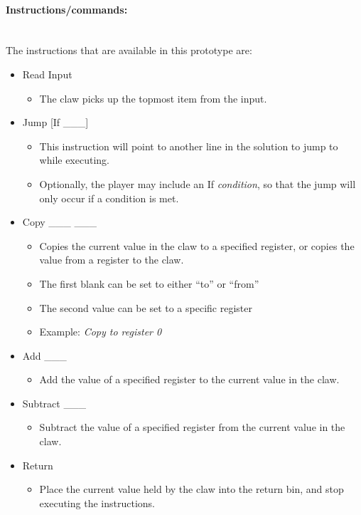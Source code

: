 \paragraph{Instructions/commands:} ~\\
The instructions that are available in this prototype are:
\begin{itemize}
	\item Read Input
	\begin{itemize}
		\item The claw picks up the topmost item from the input.
	\end{itemize}
	\item Jump [If \_\_\_]
	\begin{itemize}
		\item This instruction will point to another line in the solution to jump to while executing.
		\item Optionally, the player may include an If \textit{condition}, so that the jump will only occur if a condition is met.
	\end{itemize}
	\item Copy \_\_\_ \_\_\_
	\begin{itemize}
		\item Copies the current value in the claw to a specified register, or copies the value from a register to the claw.
		\item The first blank can be set to either ``to'' or ``from''
		\item The second value can be set to a specific register
		\item Example: \textit{Copy to register 0}
	\end{itemize}
	\item Add \_\_\_
	\begin{itemize}
		\item Add the value of a specified register to the current value in the claw.
	\end{itemize}
	\item Subtract \_\_\_
	\begin{itemize}
		\item Subtract the value of a specified register from the current value in the claw.
	\end{itemize}
	\item Return
	\begin{itemize}
		\item Place the current value held by the claw into the return bin, and stop executing the instructions.
	\end{itemize}
\end{itemize}



